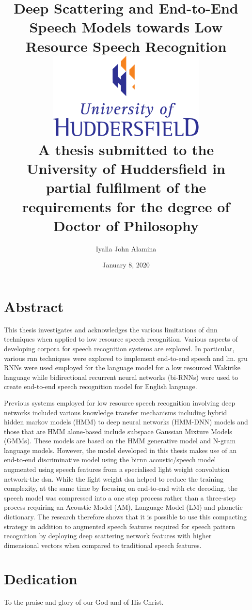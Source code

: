 \documentclass[12pt,twoside]{report}
\title{
    {Deep Scattering and End-to-End Speech Models towards Low Resource Speech Recognition}\\
    {\includegraphics{university.png}\\
A thesis submitted to the University of Huddersfield in partial fulfilment of the requirements for the degree of Doctor of Philosophy}
}
\author{Iyalla John Alamina}
\date{January 8, 2020}
\begin{document}
\maketitle
{}

\chapter*{Abstract}
This thesis investigates and acknowledges the various limitations of \acrfull{dnn} techniques when applied to low resource speech recognition.   Various aspects of developing corpora for speech recognition systems are explored.  In particular, various \acrfull{rnn} techniques were explored to implement end-to-end speech and \acrfull{lm}. \acrfull{gru} RNNs were used employed for the language model for a low resourced Wakirike language while bidirectional recurrent neural networks (bi-RNNs) were used to create end-to-end speech recognition model for English language.

Previous systems employed for low resource speech recognition involving deep networks included various knowledge transfer mechanisms including hybrid hidden markov models (HMM) to deep neural networks (HMM-DNN) models and those that are HMM alone-based include subspace Gaussian Mixture Models (GMMs).   These models are based on the HMM generative model and N-gram language models.  However, the model developed in this thesis makes use of an end-to-end discriminative model using the \acrshort{birnn} acoustic/speech model augmented using speech features from a specialised light weight convolution network-the \acrfull{dsn}.  While the light weight \acrshort{dsn} helped to reduce the training complexity, at the same time by focusing on end-to-end with \acrfull{ctc} decoding, the speech model was compressed into a one step process rather than a three-step process requiring an Acoustic Model (AM), Language Model (LM) and phonetic dictionary. The research therefore shows that it is possible to use this compacting strategy in addition to augmented speech features required for speech pattern recognition by deploying deep scattering network features with  higher dimensional vectors when compared to traditional speech features. 

\chapter*{Dedication}
To the praise and glory of our God and of His Christ.
\end{document}
